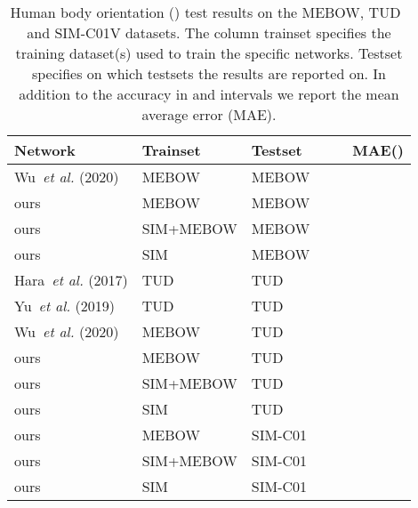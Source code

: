\documentclass[a4paper, 10pt, conference]{ieeeconf}
\begin{document}
\begin{table*}[!htbp]
  \centering

  \begin{tabular}{l l l l l l} \toprule
      Network & Trainset & Testset &  &  & MAE() \\ 
      \midrule
      Wu~\textit{et al.}\cite{wuMEBOWMonocularEstimation2020} (2020) & MEBOW & MEBOW &  &  &  \\
      ours & MEBOW & MEBOW &  &  &  \\
      ours & SIM+MEBOW & MEBOW &  &  &  \\
      ours & SIM & MEBOW &  &  &  \\\midrule
      Hara~\textit{et al.}\cite{haraDesigningDeepConvolutional2017} (2017) & TUD & TUD &  &  &  \\
      Yu~\textit{et al.}\cite{yuContinuousPedestrianOrientation2019} (2019) & TUD & TUD &  &  &  \\
      Wu~\textit{et al.}\cite{wuMEBOWMonocularEstimation2020} (2020) & MEBOW & TUD &  &  &  \\
      ours & MEBOW & TUD &  &  &  \\
      ours & SIM+MEBOW & TUD &  &  &  \\
      ours & SIM & TUD &  &  &  \\
      \midrule
      ours & MEBOW & SIM-C01 &  &  &  \\
      ours & SIM+MEBOW & SIM-C01 &  &  &  \\
      ours & SIM & SIM-C01 &  &  &  \\
  \end{tabular}
  \caption[Human body orientation () results]{Human body orientation () test results on the MEBOW, TUD~\cite{andrilukaMonocular3DPose2010} and SIM-C01V datasets. The column trainset specifies the training dataset(s) used to train the specific networks. Testset specifies on which testsets the results are reported on. In addition to the accuracy in  and  intervals we report the mean average error (MAE).}
  \label{tab:pedrec_body_orientation_estimation_results}
\end{table*}
\end{document}
